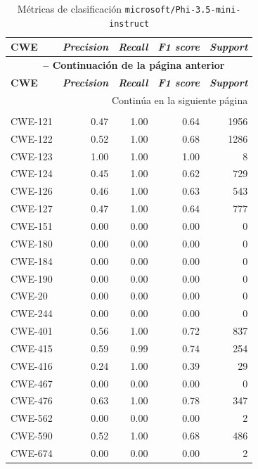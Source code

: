 \documentclass[12pt, a4paper, twoside]{article}
\begin{document}
\begin{longtable}{lrrrr}
	\caption{Métricas de clasificación \texttt{microsoft/Phi-3.5-mini-instruct}}
	\label{fig:validation-microsoft-phi-3-5-mini-instruct} \\
	\toprule
	\textbf{CWE} & \textbf{\textit{Precision}} & \textbf{\textit{Recall}} & \textbf{\textit{F1 score}} & \textbf{\textit{Support}} \\
	\midrule
	\endfirsthead
	\multicolumn{5}{c}{{\bfseries \tablename\ \thetable{} -- Continuación de la página anterior}} \\
	\toprule
	\textbf{CWE} & \textbf{\textit{Precision}} & \textbf{\textit{Recall}} & \textbf{\textit{F1 score}} & \textbf{\textit{Support}} \\
	\midrule
	\endhead
	\midrule
	\multicolumn{5}{r}{Continúa en la siguiente página} \\
	\endfoot
	\midrule
	\multicolumn{5}{l}{\textbf{\textit{Global Accuracy}:} 0.50 (50\%) -- Total de pruebas: 15.000} \\
	\bottomrule
	\endlastfoot
	CWE-121 & 0.47 & 1.00 & 0.64 & 1956 \\
	CWE-122 & 0.52 & 1.00 & 0.68 & 1286 \\
	CWE-123 & 1.00 & 1.00 & 1.00 &   8 \\
	CWE-124 & 0.45 & 1.00 & 0.62 & 729 \\
	CWE-126 & 0.46 & 1.00 & 0.63 & 543 \\
	CWE-127 & 0.47 & 1.00 & 0.64 & 777 \\
	CWE-151 & 0.00 & 0.00 & 0.00 &   0 \\
	CWE-180 & 0.00 & 0.00 & 0.00 &   0 \\
	CWE-184 & 0.00 & 0.00 & 0.00 &   0 \\
	CWE-190 & 0.00 & 0.00 & 0.00 &   0 \\
	CWE-20  & 0.00 & 0.00 & 0.00 &   0 \\
	CWE-244 & 0.00 & 0.00 & 0.00 &   0 \\
	CWE-401 & 0.56 & 1.00 & 0.72 & 837 \\
	CWE-415 & 0.59 & 0.99 & 0.74 & 254 \\
	CWE-416 & 0.24 & 1.00 & 0.39 &  29 \\
	CWE-467 & 0.00 & 0.00 & 0.00 &   0 \\
	CWE-476 & 0.63 & 1.00 & 0.78 & 347 \\
	CWE-562 & 0.00 & 0.00 & 0.00 &   2 \\
	CWE-590 & 0.52 & 1.00 & 0.68 & 486 \\
	CWE-674 & 0.00 & 0.00 & 0.00 &   2 \\

\end{longtable}
\end{document}
